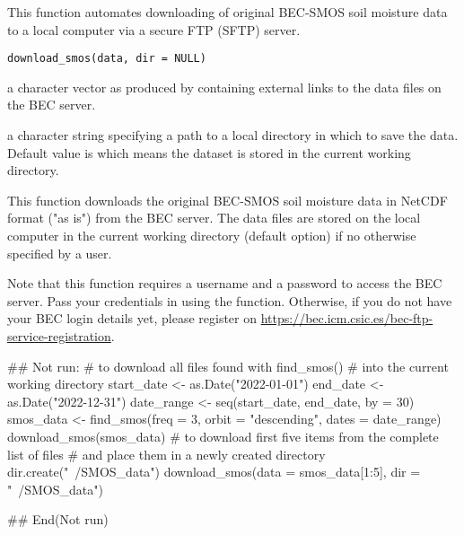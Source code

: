 \documentclass[a4paper]{book}
\begin{document}
%
\begin{Description}
This function automates downloading of original BEC-SMOS soil moisture data
to a local computer via a secure FTP (SFTP) server.
\end{Description}
%
\begin{Usage}
\begin{verbatim}
download_smos(data, dir = NULL)
\end{verbatim}
\end{Usage}
%
\begin{Arguments}
\begin{ldescription}
\item[\code{data}] a character vector as produced by  containing
external links to the data files on the BEC server.

\item[\code{dir}] a character string specifying a path to a local directory in which
to save the data. Default value is  which means the dataset is
stored in the current working directory.
\end{ldescription}
\end{Arguments}
%
\begin{Details}
This function downloads the original BEC-SMOS soil moisture data in NetCDF
format ("as is") from the BEC server. The data files are stored on the local
computer in the current working directory (default option) if no otherwise
specified by a user.

Note that this function requires a username and a password to access the BEC
server. Pass your credentials in using the
 function. Otherwise, if you
do not have your BEC login details yet, please register on
\url{https://bec.icm.csic.es/bec-ftp-service-registration}.
\end{Details}
%
\begin{Examples}
\begin{ExampleCode}
## Not run: 
# to download all files found with find_smos()
# into the current working directory
start_date <- as.Date("2022-01-01")
end_date <- as.Date("2022-12-31")
date_range <- seq(start_date, end_date, by = 30)
smos_data <- find_smos(freq = 3, orbit = "descending", dates = date_range)
download_smos(smos_data)
# to download first five items from the complete list of files
# and place them in a newly created directory
dir.create("~/SMOS_data")
download_smos(data = smos_data[1:5], dir = "~/SMOS_data")

## End(Not run)

\end{ExampleCode}
\end{Examples}
\end{document}

